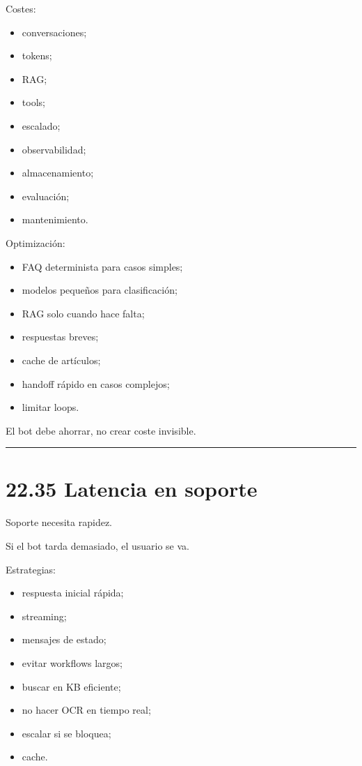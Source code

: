 Costes:

\begin{itemize}
\tightlist
\item
  conversaciones;
\item
  tokens;
\item
  RAG;
\item
  tools;
\item
  escalado;
\item
  observabilidad;
\item
  almacenamiento;
\item
  evaluación;
\item
  mantenimiento.
\end{itemize}

Optimización:

\begin{itemize}
\tightlist
\item
  FAQ determinista para casos simples;
\item
  modelos pequeños para clasificación;
\item
  RAG solo cuando hace falta;
\item
  respuestas breves;
\item
  cache de artículos;
\item
  handoff rápido en casos complejos;
\item
  limitar loops.
\end{itemize}

El bot debe ahorrar, no crear coste invisible.

\begin{center}\rule{0.5\linewidth}{0.5pt}\end{center}

\section{22.35 Latencia en soporte}\label{latencia-en-soporte}

Soporte necesita rapidez.

Si el bot tarda demasiado, el usuario se va.

Estrategias:

\begin{itemize}
\tightlist
\item
  respuesta inicial rápida;
\item
  streaming;
\item
  mensajes de estado;
\item
  evitar workflows largos;
\item
  buscar en KB eficiente;
\item
  no hacer OCR en tiempo real;
\item
  escalar si se bloquea;
\item
  cache.
\end{itemize}

